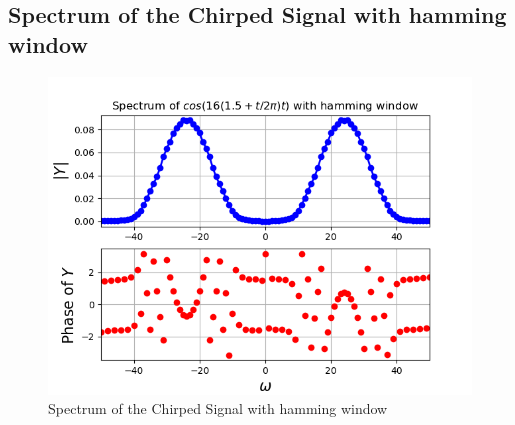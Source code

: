 \documentclass[11pt]{article}
\begin{document}
\subsection{Spectrum of the Chirped Signal with hamming window}
\begin{figure}[H]
    \centering
    \includegraphics[scale = 0.75]{Figure_10b.png}
    \caption{Spectrum of the Chirped Signal with hamming window}
\end{figure}
\end{document}
